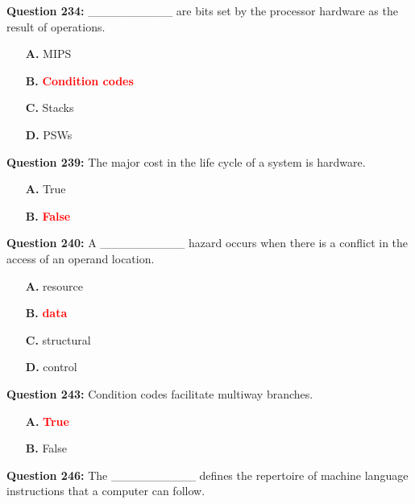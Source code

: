 \documentclass[12pt,a4paper]{article}
\begin{document}
\vspace{0.5cm}

\textbf{Question 234:} __________ are bits set by the processor hardware as the result of operations.

\begin{itemize}
    \item[\textbf{A.}] MIPS
    \item[\textbf{B.}] \textcolor{red}{\textbf{Condition codes}}
    \item[\textbf{C.}] Stacks
    \item[\textbf{D.}] PSWs
\end{itemize}

\vspace{0.5cm}

\textbf{Question 239:} The major cost in the life cycle of a system is hardware.

\begin{itemize}
    \item[\textbf{A.}] True
    \item[\textbf{B.}] \textcolor{red}{\textbf{False}}
\end{itemize}

\vspace{0.5cm}

\textbf{Question 240:} A __________ hazard occurs when there is a conflict in the access of an operand location.

\begin{itemize}
    \item[\textbf{A.}] resource
    \item[\textbf{B.}] \textcolor{red}{\textbf{data}}
    \item[\textbf{C.}] structural
    \item[\textbf{D.}] control
\end{itemize}

\vspace{0.5cm}

\textbf{Question 243:} Condition codes facilitate multiway branches.

\begin{itemize}
    \item[\textbf{A.}] \textcolor{red}{\textbf{True}}
    \item[\textbf{B.}] False
\end{itemize}

\vspace{0.5cm}

\textbf{Question 246:} The __________ defines the repertoire of machine language instructions that a computer can follow.
\end{document}
